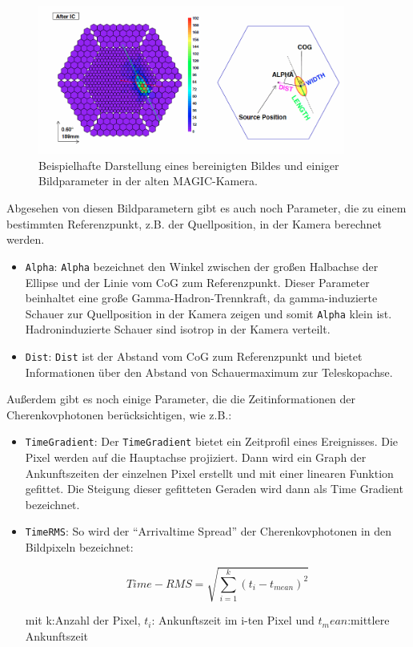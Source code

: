 \begin{figure}
    \centering
    \includegraphics[width=0.9\textwidth]{./Plots/03_MonteCarlos/CleaningBild.png}
    \caption{Beispielhafte Darstellung eines bereinigten Bildes und einiger Bildparameter in der alten MAGIC-Kamera.}
    \label{CleaningBild}
\end{figure}

Abgesehen von diesen Bildparametern gibt es auch noch Parameter, die zu einem bestimmten Referenzpunkt, z.B. der Quellposition, in der Kamera berechnet werden. 

\begin{itemize}
 \item \texttt{Alpha}: \texttt{Alpha} bezeichnet den Winkel zwischen der großen Halbachse der Ellipse und der Linie vom CoG zum Referenzpunkt.
 Dieser Parameter beinhaltet eine große Gamma-Hadron-Trennkraft, da gamma-induzierte Schauer zur Quellposition in der Kamera zeigen und somit \texttt{Alpha} klein ist.
 Hadroninduzierte Schauer sind isotrop in der Kamera verteilt.
 \item \texttt{Dist}: \texttt{Dist} ist der Abstand vom CoG zum Referenzpunkt und bietet Informationen über den Abstand von Schauermaximum zur Teleskopachse.
\end{itemize}

Außerdem gibt es noch einige Parameter, die die Zeitinformationen der Cherenkovphotonen berücksichtigen, wie z.B.:

\begin{itemize}
 \item \texttt{TimeGradient}: Der \texttt{TimeGradient} bietet ein Zeitprofil eines Ereignisses.
 Die Pixel werden auf die Hauptachse projiziert.
 Dann wird ein Graph der Ankunftszeiten der einzelnen Pixel erstellt und mit einer linearen Funktion gefittet.
 Die Steigung dieser gefitteten Geraden wird dann als Time Gradient bezeichnet.
 \item \texttt{TimeRMS}: So wird der ``Arrivaltime Spread'' der Cherenkovphotonen in den Bildpixeln bezeichnet:
 
\begin{equation}
 Time-RMS=\sqrt{\sum_{i=1}^k (t_i-t_{mean})^2}
\end{equation}
 \begin{centering}
  \small{mit k:Anzahl der Pixel, $t_i$: Ankunftszeit im i-ten Pixel und $t_mean$:mittlere Ankunftszeit}
 \end{centering}


\end{itemize}

